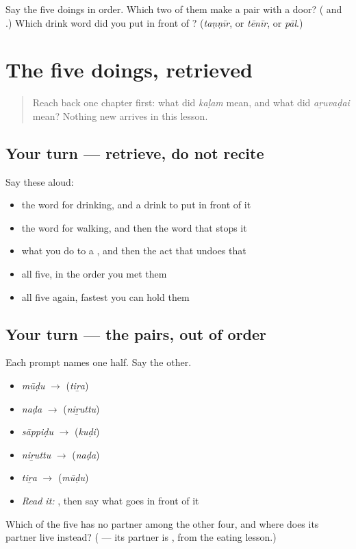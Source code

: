 \begin{tcolorbox}[breakable,colback=teal!4,colframe=teal!35!black,title={Before you move on}]
Say the five doings in order. Which two of them make a pair with a door? (\textbf{} and \textbf{}.) Which drink word did you put in front of \textbf{}? (\emph{taṇṇīr}, or \emph{tēnīr}, or \emph{pāl}.)
\end{tcolorbox}
\section[Practice]{The five doings, retrieved}

\label{lesson:TA-C65-doing-recall}



\begin{quote}
Reach back one chapter first: what did \emph{kaḷam} mean, and what did \emph{aṟuvaḍai} mean? Nothing new arrives in this lesson.
\end{quote}

\subsection*{Your turn — retrieve, do not recite}
Say these aloud:

\begin{itemize}
\raggedright
  \item the word for drinking, and a drink to put in front of it
  \item the word for walking, and then the word that stops it
  \item what you do to a , and then the act that undoes that
  \item all five, in the order you met them
  \item all five again, fastest you can hold them
\end{itemize}

\subsection*{Your turn — the pairs, out of order}
Each prompt names one half. Say the other.

\begin{itemize}
\raggedright
  \item \emph{mūḍu} $\to$ (\emph{tiṟa})
  \item \emph{naḍa} $\to$ (\emph{niṟuttu})
  \item \emph{sāppiḍu} $\to$ (\emph{kuḍi})
  \item \emph{niṟuttu} $\to$ (\emph{naḍa})
  \item \emph{tiṟa} $\to$ (\emph{mūḍu})
  \item \emph{Read it:} \textbf{}, then say what goes in front of it
\end{itemize}

\begin{tcolorbox}[breakable,colback=teal!4,colframe=teal!35!black,title={Before you move on}]
Which of the five has no partner among the other four, and where does its partner live instead? (\textbf{} — its partner is \textbf{}, from the eating lesson.)
\end{tcolorbox}
